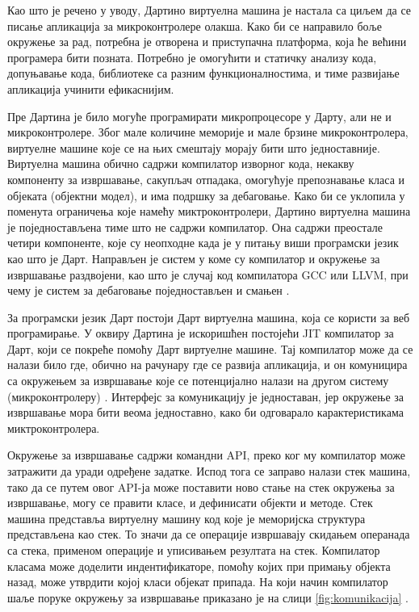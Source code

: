 \documentclass[12pt,oneside]{memoir}
\begin{document}
Као што је речено у уводу, Дартино виртуелна машина је настала са циљем да се писање апликација за микроконтролере олакша. Како би се направило боље окружење за рад, потребна је отворена и приступачна платформа, која ће већини програмера бити позната. Потребно је омогућити и статичку анализу кода, допуњавање кода, библиотеке са разним функционалностима, и тиме развијање апликација учинити ефикаснијим.

Пре Дартина је било могуће програмирати микропроцесоре у Дарту, али не и микроконтролере. Због мале количине меморије и мале брзине микроконтролера, виртуелне машине које се на њих смештају морају бити што једноставније. Виртуелна машина обично садржи компилатор изворног кода, некакву компоненту за извршавање, сакупљач отпадака, омогућује препознавање класа и објеката (објектни модел), и има подршку за дебаговање. Како би се уклопила у поменута ограничења које намећу миктроконтролери, Дартино виртуелна машина је поједностављена тиме што не садржи компилатор. Она садржи преостале четири компоненте, које су неопходне када је у питању виши програмски језик као што је Дарт. Направљен је систем у коме су компилатор и окружење за извршавање раздвојени, као што је случај код компилатора GCC или LLVM, при чему је систем за дебаговање поједностављен и смањен \cite{Dartino}.

За програмски језик Дарт постоји Дарт виртуелна машина, која се користи за веб програмирање. У оквиру Дартина је искоришћен постојећи JIT компилатор за Дарт, који се покреће помоћу Дарт виртуелне машине. Тај компилатор може да се налази било где, обично на рачунару где се развија апликација, и он комуницира са окружењем за извршавање које се потенцијално налази на другом систему (микроконтролеру) \cite{Dartino}. Интерфејс за комуникацију је једноставан, јер окружење за извршавање мора бити веома једноставно, како би одговарало карактеристикама миктроконтролера.

Окружење за извршавање садржи командни API, преко ког му компилатор може затражити да уради одређене задатке. Испод тога се заправо налази стек машина, тако да се путем овог API-ја може поставити ново стање на стек окружења за извршавање, могу се правити класе, и дефинисати објекти и методе. Стек машина представља виртуелну машину код које је меморијска структура представљена као стек. То значи да се операције извршавају скидањем операнада са стека, применом операције и уписивањем резултата на стек. Компилатор класама може доделити индентификаторе, помоћу којих при примању објекта назад, може утврдити којој класи објекат припада. На који начин компилатор шаље поруке окружењу за извршавање приказано је на слици \ref{fig:komunikacija} \cite{Dartino}.
\end{document}
